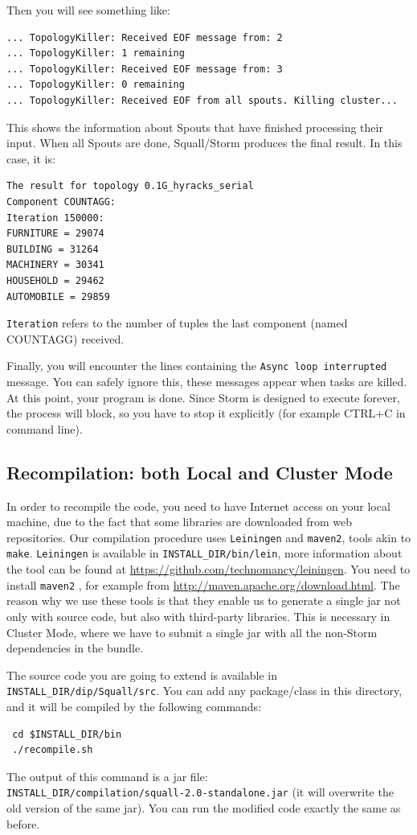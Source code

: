 \documentclass[a4paper,10pt]{article}
\begin{document}
Then you will see something like:
\begin{verbatim}
... TopologyKiller: Received EOF message from: 2
... TopologyKiller: 1 remaining
... TopologyKiller: Received EOF message from: 3
... TopologyKiller: 0 remaining
... TopologyKiller: Received EOF from all spouts. Killing cluster...
\end{verbatim}

This shows the information about Spouts that have finished processing their input. When all Spouts are done, Squall/Storm produces the final result. In this case, it is:
\begin{verbatim}
The result for topology 0.1G_hyracks_serial
Component COUNTAGG:
Iteration 150000:
FURNITURE = 29074
BUILDING = 31264
MACHINERY = 30341
HOUSEHOLD = 29462
AUTOMOBILE = 29859
\end{verbatim}

\verb#Iteration# refers to the number of tuples the last component (named COUNTAGG) received.

Finally, you will encounter the lines containing the \verb#Async loop interrupted# message. You can safely ignore this, these messages appear when tasks are killed. At this point, your program is done. Since Storm is designed to execute forever, the process will block, so you have to stop it explicitly (for example CTRL+C in command line).

\subsection{Recompilation: both Local and Cluster Mode}
In order to recompile the code, you need to have Internet access on your local machine, due to the fact that some libraries are downloaded from web repositories. Our compilation procedure uses \verb#Leiningen# and \verb#maven2#, tools akin to \verb#make#. \verb#Leiningen# is available in \verb#INSTALL_DIR/bin/lein#, more information about the tool can be found at \url{https://github.com/technomancy/leiningen}. You need to install \verb#maven2# , for example from \url{http://maven.apache.org/download.html}. The reason why we use these tools is that they enable us to generate a single jar not only with source code, but also with third-party libraries. This is necessary in Cluster Mode, where we have to submit a single jar with all the non-Storm dependencies in the bundle.

The source code you are going to extend is available in \verb#INSTALL_DIR/dip/Squall/src#. You can add any package/class in this directory, and it will be compiled by the following commands:
\begin{verbatim}
 cd $INSTALL_DIR/bin
 ./recompile.sh
\end{verbatim}
The output of this command is a jar file: \\ \verb#INSTALL_DIR/compilation/squall-2.0-standalone.jar# (it will overwrite the old version of the same jar). You can run the modified code exactly the same as before.
\end{document}
